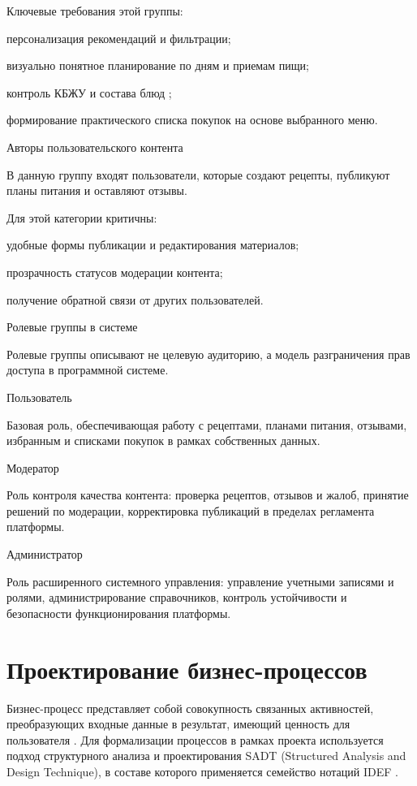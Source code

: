 Ключевые требования этой группы:
\begin{compactlist}
  \item персонализация рекомендаций и фильтрации;
  \item визуально понятное планирование по дням и приемам пищи;
  \item контроль КБЖУ и состава блюд \cite{sektascience_bzhu_2026};
  \item формирование практического списка покупок на основе выбранного меню.
\end{compactlist}

Авторы пользовательского контента

В данную группу входят пользователи, которые создают рецепты, публикуют планы питания и оставляют отзывы.

Для этой категории критичны:
\begin{compactlist}
  \item удобные формы публикации и редактирования материалов;
  \item прозрачность статусов модерации контента;
  \item получение обратной связи от других пользователей.
\end{compactlist}

Ролевые группы в системе

Ролевые группы описывают не целевую аудиторию, а модель разграничения прав доступа в программной системе.

Пользователь

Базовая роль, обеспечивающая работу с рецептами, планами питания, отзывами, избранным и списками покупок в рамках собственных данных.

Модератор

Роль контроля качества контента: проверка рецептов, отзывов и жалоб, принятие решений по модерации, корректировка публикаций в пределах регламента платформы.

Администратор

Роль расширенного системного управления: управление учетными записями и ролями, администрирование справочников, контроль устойчивости и безопасности функционирования платформы.

\section{Проектирование бизнес-процессов}

Бизнес-процесс представляет собой совокупность связанных активностей, преобразующих входные данные в результат, имеющий ценность для пользователя \cite{kirillina_bpm_2022}. Для формализации процессов в рамках проекта используется подход структурного анализа и проектирования SADT (Structured Analysis and Design Technique), в составе которого применяется семейство нотаций IDEF \cite{mindalev_idef_2016,sadt_intro_ross,idef0_fips_183}.

